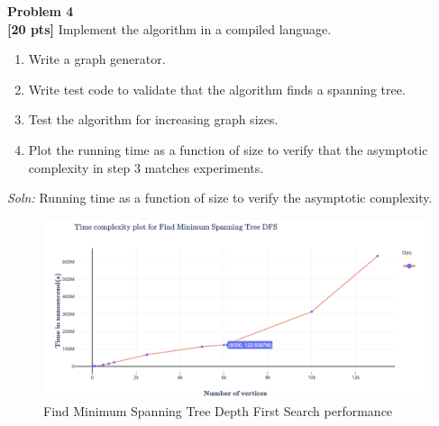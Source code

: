 \documentclass{article}
\newenvironment{problem}[2][Problem]
    { \begin{mdframed}[backgroundcolor=gray!20] \textbf{#1 #2} \\}
    {  \end{mdframed}}
\newenvironment{solution}
    {\textit{Soln:}}
    {}
\begin{document}
\begin{problem}{4}
\textbf{[20 pts]} Implement the algorithm in a compiled language.
\begin{enumerate}
    \item Write a graph generator.
    \item Write test code to validate that the algorithm finds a spanning tree.
    \item Test the algorithm for increasing graph sizes.
    \item Plot the running time as a function of size to verify that the asymptotic complexity in step 3 matches experiments.
\end{enumerate}
\end{problem}
\begin{solution}
Running time as a function of size to verify the asymptotic complexity.
\begin{figure}[h]
    \centering
    \includegraphics[scale=0.5]{Alg-2}
    \caption{Find Minimum Spanning Tree Depth First Search performance}
    \label{fig:my_label}
\end{figure}
\end{solution}
\end{document}
